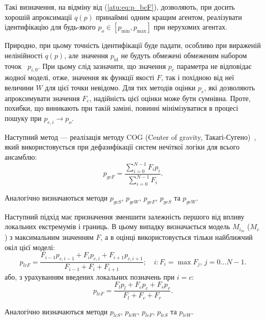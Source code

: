 Такі визначення, на відміну від (\ref{atu:eq:p_bcF}), дозволяють,
при досить хорошій апроксимації $q(p)$ принаймні одним кращим агентом,
реалізувати ідентифікацію для будь-якого
$p_o \in [p_{\min}, p_{\max}]$ при нерухомих агентах.

Природно, при цьому точність ідентифікації буде падати, особливо
при вираженій нелінійності
$ q (p) $, але значення
$ p_\mathrm{id} $ не будуть обмежені обмеженим набором точок~
$ p_{i, 0} $. При цьому слід зазначити, що значення
$ p_e $ параметра не відповідає жодної моделі, отже, значення як
функції якості
$ F $, так і похідною від неї величини
$ W $ для цієї точки невідомо. Для тих методів оцінки
$ p_e $, які дозволяють апроксимувати значення
$ F_e $, надійність цієї оцінки може бути сумнівна. Проте, похибки,
що виникають при такій заміні, повинні мінімізуватися в процесі
пошуку при
$ p_{e, i} \to p_o $.


Наступний метод --- реалізація методу
COG (Center of gravity, Такагі-Сугено)~\cite{atu_asau25,atu_csit2015,atu_asau16},
який використовується при дефазифікації систем нечіткої логіки для всього
ансамблю:
%
\begin{equation}
  p_{gcF}
  =
  \frac{\sum\limits_{i=0}^{N-1} F_{i} p_{i}}
       {\sum\limits_{i=0}^{N-1} F_{i} }
  .
  \label{atu:eq:p_gcF}
\end{equation}

Аналогічно визначаються методи
$p_{gcS}$,
$p_{gcW}$,
$p_{geF}$,
$p_{geS}$ та
$p_{geW}$.


Наступний підхід має призначення зменшити залежність першого від впливу локальних
екстремумів і границь. В цьому випадку визначається модель $M_{i_{m}}$ ($M_{c}$) з
максимальним значенням $F$, а в оцінці використовується тільки найближчий
окіл цієї моделі:
%
\begin{equation}
  p_{lcF}
  =
  \frac{ F_{i-1} p_{c,i-1} + F_{i} p_{c,i} + F_{i+1} p_{c,i+1} }
       { F_{i-1}           + F_{i}         + F_{i+1}         }
  ;
  \quad
  i : F_i = \max{F_j}, \, j=0 \ldots N-1 .
  \label{atu:eq:p_lcF}
\end{equation}
%
або, з урахуванням введених локальних позначень при $ i = c $:
%
\begin{equation}
  p_{leF}
  =
  \frac{ F_{l} p_{l} + F_{c} p_{c} + F_{r} p_{r} }
       { F_{l}       + F_{c}       + F_{r}       }
  .
  \label{atu:eq:p_lcFl}
\end{equation}

Аналогічно визначаються методи
$p_{lcS}$,
$p_{lcW}$,
$p_{leF}$,
$p_{leS}$ та
$p_{leW}$.

